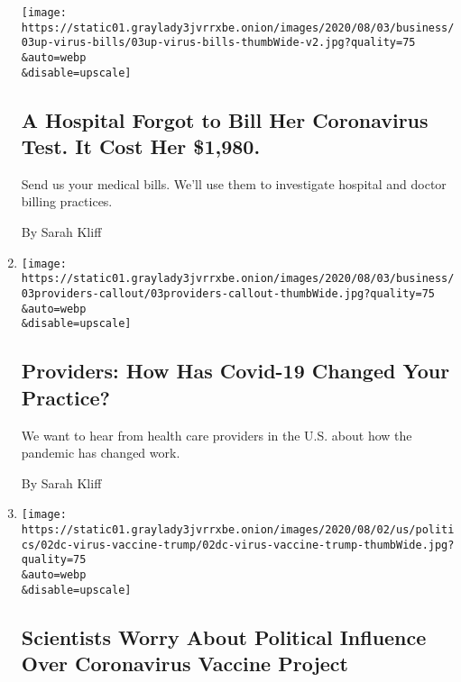 \begin{enumerate}
  \texttt{[image: https://static01.graylady3jvrrxbe.onion/images/2020/08/03/business/03up-virus-bills/03up-virus-bills-thumbWide-v2.jpg?quality=75\\\&auto=webp\\\&disable=upscale]}

  \hypertarget{a-hospital-forgot-to-bill-her-coronavirus-test-it-cost-her-1980-1}{%
  \subsection{A Hospital Forgot to Bill Her Coronavirus Test. It Cost
  Her
  \$1,980.}\label{a-hospital-forgot-to-bill-her-coronavirus-test-it-cost-her-1980-1}}

  Send us your medical bills. We'll use them to investigate hospital and
  doctor billing practices.

  By Sarah Kliff
\item
  \href{/2020/08/03/reader-center/healthcare-workers-coronavirus-care.html}{}

  \texttt{[image: https://static01.graylady3jvrrxbe.onion/images/2020/08/03/business/03providers-callout/03providers-callout-thumbWide.jpg?quality=75\\\&auto=webp\\\&disable=upscale]}

  \hypertarget{providers-how-has-covid-19-changed-your-practice}{%
  \subsection{Providers: How Has Covid-19 Changed Your
  Practice?}\label{providers-how-has-covid-19-changed-your-practice}}

  We want to hear from health care providers in the U.S. about how the
  pandemic has changed work.

  By Sarah Kliff
\item
  \href{/2020/08/02/us/politics/coronavirus-vaccine.html}{}

  \texttt{[image: https://static01.graylady3jvrrxbe.onion/images/2020/08/02/us/politics/02dc-virus-vaccine-trump/02dc-virus-vaccine-trump-thumbWide.jpg?quality=75\\\&auto=webp\\\&disable=upscale]}

  \hypertarget{scientists-worry-about-political-influence-over-coronavirus-vaccine-project}{%
  \subsection{Scientists Worry About Political Influence Over
  Coronavirus Vaccine
  Project}\label{scientists-worry-about-political-influence-over-coronavirus-vaccine-project}}


\end{enumerate}
